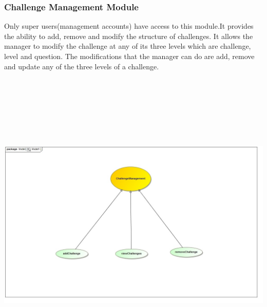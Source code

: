 \documentclass[english]{article}
\begin{document}
		\subsubsection{Challenge Management Module}
		Only super users(management accounts) have access to this module.It provides the ability to add, remove and modify the structure of challenges. It allows the manager to modify the challenge at any of its three levels which are challenge, level and question. The modifications that the manager can do are add, remove and update any of the three levels of a challenge. \newline
		
		\includegraphics[width=15cm,height=15cm,keepaspectratio]{challengeManagement.jpg}
		
\end{document}
